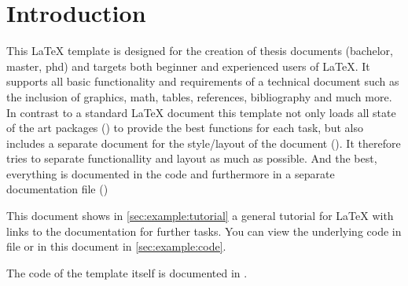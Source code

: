 
\chapter{Introduction}

This \LaTeX{} template is designed for the creation of thesis documents (bachelor, master, phd) and targets both beginner and experienced users of \LaTeX{}. It supports all basic functionality and requirements of a technical document such as the inclusion of graphics, math, tables, references, bibliography and much more. In contrast to a standard LaTeX document this template not only loads all state of the art packages () to provide the best functions for each task, but also includes a separate document for the style/layout of the document (). It therefore tries to separate functionallity and layout as much as possible. And the best, everything is documented in the code and furthermore in a separate documentation file ()

This document shows in \cref{sec:example:tutorial} a general tutorial for \LaTeX{} with links to the documentation for further tasks. You can view the underlying code in file  or in this document in \cref{sec:example:code}.

The code of the template itself is documented in .